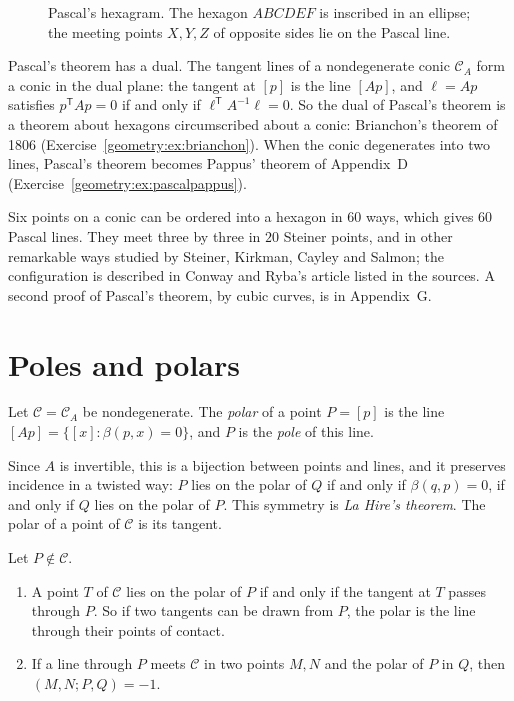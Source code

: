 \begin{figure}[ht]
\centering
{}
\caption{Pascal's hexagram. The hexagon $ABCDEF$ is inscribed in an ellipse; the meeting points $X,Y,Z$ of opposite sides lie on the Pascal line.}
\label{geometry:fig:pascal}
\end{figure}

Pascal's theorem has a dual. The tangent lines of a nondegenerate conic $\mathcal C_A$ form a conic in the dual plane: the tangent at $[p]$ is the
line $[Ap]$, and $\ell=Ap$ satisfies $p^{\mathsf T}Ap=0$ if and only if $\ell^{\mathsf T}A^{-1}\ell=0$. So the dual of Pascal's theorem is a theorem
about hexagons circumscribed about a conic: Brianchon's theorem of 1806 (Exercise~\ref{geometry:ex:brianchon}). When the conic degenerates into two lines,
Pascal's theorem becomes Pappus' theorem of Appendix~D (Exercise~\ref{geometry:ex:pascalpappus}).

\begin{remark}
Six points on a conic can be ordered into a hexagon in $60$ ways, which gives $60$ Pascal lines. They meet three by three in $20$ Steiner points,
and in other remarkable ways studied by Steiner, Kirkman, Cayley and Salmon; the configuration is described in Conway and Ryba's article listed in the
sources. A second proof of Pascal's theorem, by cubic curves, is in Appendix~G.
\end{remark}

\section{Poles and polars}

\begin{definition}
Let $\mathcal C=\mathcal C_A$ be nondegenerate. The \emph{polar} of a point $P=[p]$ is the line $[Ap]=\{[x]:\beta(p,x)=0\}$, and $P$ is the \emph{pole} of
this line.
\end{definition}

Since $A$ is invertible, this is a bijection between points and lines, and it preserves incidence in a twisted way: $P$ lies on the polar of $Q$
if and only if $\beta(q,p)=0$, if and only if $Q$ lies on the polar of $P$. This symmetry is \emph{La Hire's theorem}. The polar of a point of
$\mathcal C$ is its tangent.

\begin{proposition}\label{geometry:prop:polar}
Let $P\notin\mathcal C$.
\begin{enumerate}
\item A point $T$ of $\mathcal C$ lies on the polar of $P$ if and only if the tangent at $T$ passes through $P$. So if two tangents can be drawn from
$P$, the polar is the line through their points of contact.
\item If a line through $P$ meets $\mathcal C$ in two points $M,N$ and the polar of $P$ in $Q$, then $(M,N;P,Q)=-1$.
\end{enumerate}
\end{proposition}

